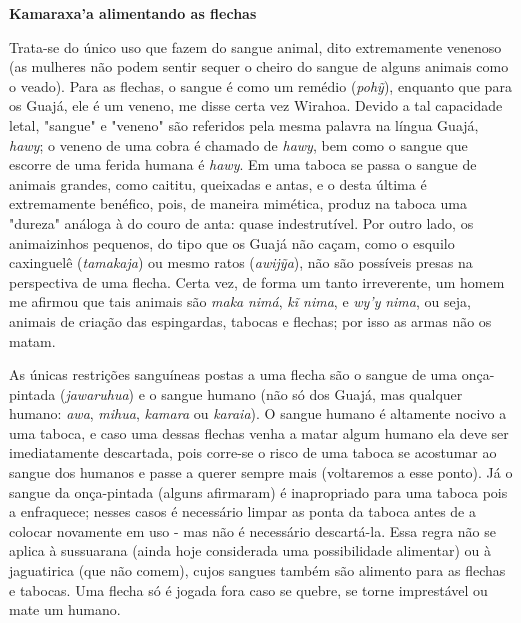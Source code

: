 \textbf{Kamaraxa'a alimentando as flechas}

Trata-se do único uso que fazem do sangue animal, dito extremamente
venenoso (as mulheres não podem sentir sequer o cheiro do sangue de
alguns animais como o veado). Para as flechas, o sangue é como um
remédio (\emph{pohỹ}), enquanto que para os Guajá, ele é um veneno, me
disse certa vez Wirahoa. Devido a tal capacidade letal, "sangue" e
"veneno" são referidos pela mesma palavra na língua Guajá, \emph{hawy};
o veneno de uma cobra é chamado de \emph{hawy}, bem como o sangue que
escorre de uma ferida humana é \emph{hawy}. Em uma taboca se passa o
sangue de animais grandes, como caititu, queixadas e antas, e o desta
última é extremamente benéfico, pois, de maneira mimética, produz na
taboca uma "dureza" análoga à do couro de anta: quase indestrutível. Por
outro lado, os animaizinhos pequenos, do tipo que os Guajá não caçam,
como o esquilo caxinguelê (\emph{tamakaja}) ou mesmo ratos
(\emph{awijỹa}), não são possíveis presas na perspectiva de uma flecha.
Certa vez, de forma um tanto irreverente, um homem me afirmou que tais
animais são \emph{maka} \emph{nimá}, \emph{kĩ nima}, e \emph{wy'y}
\emph{nima}, ou seja, animais de criação das espingardas, tabocas e
flechas; por isso as armas não os matam.

As únicas restrições sanguíneas postas a uma flecha são o sangue de uma
onça-pintada (\emph{jawaruhua}) e o sangue humano (não só dos Guajá, mas
qualquer humano: \emph{awa}, \emph{mihua}, \emph{kamara} ou
\emph{karaia}). O sangue humano é altamente nocivo a uma taboca, e caso
uma dessas flechas venha a matar algum humano ela deve ser imediatamente
descartada, pois corre-se o risco de uma taboca se acostumar ao sangue
dos humanos e passe a querer sempre mais (voltaremos a esse ponto). Já o
sangue da onça-pintada (alguns afirmaram) é inapropriado para uma taboca
pois a enfraquece; nesses casos é necessário limpar as ponta da taboca
antes de a colocar novamente em uso - mas não é necessário descartá-la.
Essa regra não se aplica à sussuarana (ainda hoje considerada uma
possibilidade alimentar) ou à jaguatirica (que não comem), cujos sangues
também são alimento para as flechas e tabocas. Uma flecha só é jogada
fora caso se quebre, se torne imprestável ou mate um humano.

